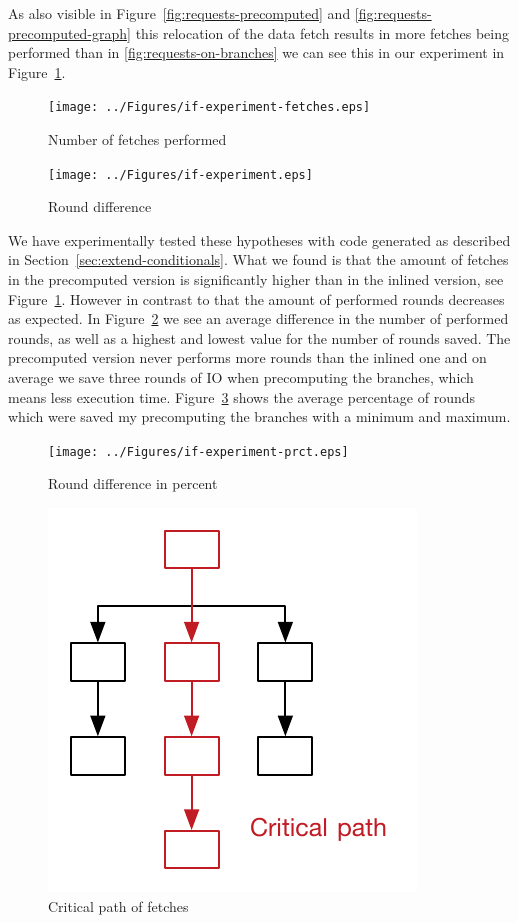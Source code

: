 As also visible in Figure~\ref{fig:requests-precomputed} and \ref{fig:requests-precomputed-graph} this relocation of the data fetch results in more fetches being performed than in \ref{fig:requests-on-branches} we can see this in our experiment in Figure~\ref{fig:if-experiment-fetches}.

\begin{figure}
    \texttt{[image: ../Figures/if-experiment-fetches.eps]}
    \caption{Number of fetches performed}
    \label{fig:if-experiment-fetches}
\end{figure}

\begin{figure}
    \texttt{[image: ../Figures/if-experiment.eps]}
    \caption{Round difference}
    \label{fig:if-experiment}
\end{figure}

We have experimentally tested these hypotheses with code generated as described in Section~\ref{sec:extend-conditionals}.
What we found is that the amount of fetches in the precomputed version is significantly higher than in the inlined version, see Figure~\ref{fig:if-experiment-fetches}.
However in contrast to that the amount of performed rounds decreases as expected.
In Figure~\ref{fig:if-experiment} we see an average difference in the number of performed rounds, as well as a highest and lowest value for the number of rounds saved.
The precomputed version never performs more rounds than the inlined one and on average we save three rounds of IO when precomputing the branches, which means less execution time.
Figure~\ref{fig:if-experiment-prct} shows the average percentage of rounds which were saved my precomputing the branches with a minimum and maximum.

\begin{figure}
  \texttt{[image: ../Figures/if-experiment-prct.eps]}
  \caption{Round difference in percent}
  \label{fig:if-experiment-prct}
\end{figure}

\begin{figure}
    \includegraphics[width=.5\textwidth]{../Figures/critical-path}
    \caption{Critical path of fetches}
    \label{fig:critical-path}
\end{figure}

